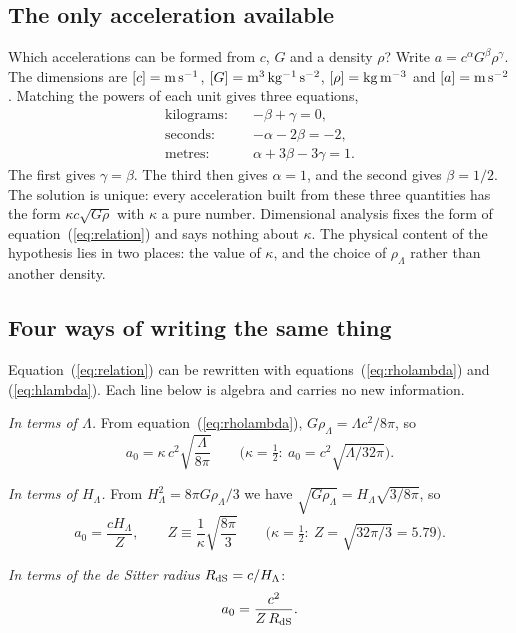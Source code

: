 \documentclass[fleqn,usenatbib]{mnras}
\begin{document}
\subsection{The only acceleration available}
Which accelerations can be formed from $c$, $G$ and a density $\rho$? Write $a=c^{\alpha}G^{\beta}\rho^{\gamma}$. The dimensions are $[c]={\rm m\,s^{-1}}$, $[G]={\rm m^{3}\,kg^{-1}\,s^{-2}}$, $[\rho]={\rm kg\,m^{-3}}$ and $[a]={\rm m\,s^{-2}}$. Matching the powers of each unit gives three equations,
\begin{align}
\text{kilograms:}\quad & -\beta+\gamma=0,\\
\text{seconds:}\quad & -\alpha-2\beta=-2,\\
\text{metres:}\quad & \alpha+3\beta-3\gamma=1.
\end{align}
The first gives $\gamma=\beta$. The third then gives $\alpha=1$, and the second gives $\beta=1/2$. The solution is unique: every acceleration built from these three quantities has the form $\kappa c\sqrt{G\rho}$ with $\kappa$ a pure number. Dimensional analysis fixes the form of equation~(\ref{eq:relation}) and says nothing about $\kappa$. The physical content of the hypothesis lies in two places: the value of $\kappa$, and the choice of $\rho_\Lambda$ rather than another density.

\subsection{Four ways of writing the same thing}
\label{sec:forms}
Equation~(\ref{eq:relation}) can be rewritten with equations~(\ref{eq:rholambda}) and (\ref{eq:hlambda}). Each line below is algebra and carries no new information.

\emph{In terms of $\Lambda$.} From equation~(\ref{eq:rholambda}), $G\rho_\Lambda=\Lambda c^2/8\pi$, so
\begin{equation}
a_0=\kappa\,c^2\sqrt{\frac{\Lambda}{8\pi}}\qquad\Big(\kappa=\tfrac12:\ a_0=c^2\sqrt{\Lambda/32\pi}\Big).
\end{equation}

\emph{In terms of $H_\Lambda$.} From $H_\Lambda^2=8\pi G\rho_\Lambda/3$ we have $\sqrt{G\rho_\Lambda}=H_\Lambda\sqrt{3/8\pi}$, so
\begin{equation}
a_0=\frac{cH_\Lambda}{Z},\qquad Z\equiv\frac{1}{\kappa}\sqrt{\frac{8\pi}{3}}\qquad\Big(\kappa=\tfrac12:\ Z=\sqrt{32\pi/3}=5.79\Big).
\label{eq:Z}
\end{equation}

\emph{In terms of the de Sitter radius} $R_{\rm dS}=c/H_\Lambda$:
\begin{equation}
a_0=\frac{c^2}{Z\,R_{\rm dS}} .
\end{equation}
\end{document}
